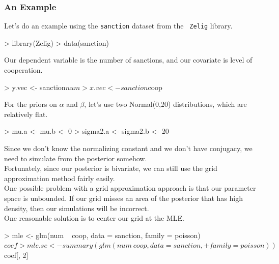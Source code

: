 \documentclass{beamer}
\begin{document}
\begin{frame}[fragile]
\frametitle{An Example}
\pause
Let's do an example using the {\tt sanction} dataset from the {\tt
Zelig} library.
\pause
\tiny
\begin{Schunk}
\begin{Sinput}
> library(Zelig)
> data(sanction)
\end{Sinput}
\end{Schunk}
\bigskip
\pause
\normalsize
Our dependent variable is the number of sanctions, and our covariate
is level of cooperation.
\pause
\tiny
\begin{Schunk}
\begin{Sinput}
> y.vec <- sanction$num
> x.vec <- sanction$coop
\end{Sinput}
\end{Schunk}
\normalsize
\bigskip
\pause
For the priors on $\alpha$ and $\beta$, let's use two Normal(0,20)
distributions, which are relatively flat.
\tiny
\pause
\begin{Schunk}
\begin{Sinput}
> mu.a <- mu.b <- 0
> sigma2.a <- sigma2.b <- 20
\end{Sinput}
\end{Schunk}
\end{frame}

\begin{frame}[fragile]
Since we don't know the normalizing constant and we don't have
conjugacy, we need to simulate from the posterior somehow.  \\
\pause
\bigskip
Fortunately, since our posterior is bivariate, we can still use the
grid approximation method fairly easily. \\
\pause
\bigskip
One possible problem with a grid approximation approach is that our
parameter space is unbounded.  \pause If our grid misses an area of the
posterior that has high density, then our simulations will be incorrect.\\ 
\pause
\bigskip
One reasonable solution is to center our grid at the MLE.
\pause
\bigskip
\pause
\tiny
\begin{Schunk}
\begin{Sinput}
> mle <- glm(num ~ coop, data = sanction, family = poisson)$coef
> mle.se <- summary(glm(num ~ coop, data = sanction, 
+     family = poisson))$coef[, 2]
\end{Sinput}
\end{Schunk}
\end{frame}
\end{document}
